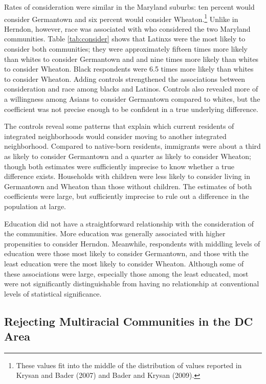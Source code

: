 \documentclass{baderart}
\begin{document}
Rates of consideration were similar in the Maryland suburbs: ten percent would consider Germantown and six percent would consider Wheaton.\footnote{These values fit into the middle of the distribution of values reported in Krysan and Bader (2007) and Bader and Krysan (2009).} Unlike in Herndon, however, race was associated with who considered the two Maryland communities. Table \ref{tab:consider} shows that Latinxs were the most likely to consider both communities; they were approximately fifteen times more likely than whites to consider Germantown and and nine times more likely than whites to consider Wheaton. Black respondents were 6.5 times more likely than whites to consider Wheaton. Adding controls strengthened the associations between consideration and race among blacks and Latinos. Controls also revealed more of a willingness among Asians to consider Germantown compared to whites, but the coefficient was not precise enough to be confident in a true underlying difference. 

The controls reveal some patterns that explain which current residents of integrated neighborhoods would consider moving to another integrated neighborhood. Compared to native-born residents, immigrants were about a third as likely to consider Germantown and a quarter as likely to consider Wheaton; though both estimates were sufficiently imprecise to know whether a true difference exists. Households with children were less likely to consider living in Germantown and Wheaton than those without children. The estimates of both coefficients were large, but sufficiently imprecise to rule out a difference in the population at large. 

Education did not have a straightforward relationship with the consideration of the communities. More education was generally associated with higher propensities to consider Herndon. Meanwhile, respondents with middling levels of education were those most likely to consider Germantown, and those with the least education were the most likely to consider Wheaton. Although some of these associations were large, especially those among the least educated, most were not significantly distinguishable from having no relationship at conventional levels of statistical significance. 

\subsection{Rejecting Multiracial Communities in the DC Area}\label{ssec:reject}
\end{document}
